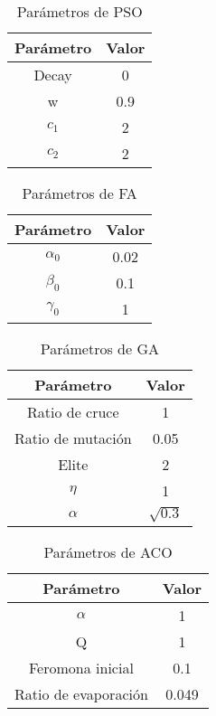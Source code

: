 \begin{table}[H]
    \centering
    \begin{tabular}{ c c }
        \hline
        \textbf{Parámetro} & \textbf{Valor} \\
        \hline
        Decay              & 0              \\
        w                  & 0.9            \\
        $c_1$              & 2              \\
        $c_2$              & 2              \\
        \hline
    \end{tabular}
    \caption{Parámetros de PSO}
\end{table}

\begin{table}[H]
    \centering
    \begin{tabular}{ c c }
        \hline
        \textbf{Parámetro} & \textbf{Valor} \\
        \hline
        $\alpha_0$         & 0.02           \\
        $\beta_0$          & 0.1            \\
        $\gamma_0$         & 1              \\
        \hline
    \end{tabular}
    \caption{Parámetros de FA}
\end{table}

\begin{table}[H]
    \centering
    \begin{tabular}{ c c }
        \hline
        \textbf{Parámetro} & \textbf{Valor} \\
        \hline
        Ratio de cruce     & 1              \\
        Ratio de mutación  & 0.05           \\
        Elite              & 2              \\
        $\eta$             & 1              \\
        $\alpha$           & $\sqrt{0.3}$   \\
        \hline
    \end{tabular}
    \caption{Parámetros de GA}
\end{table}

\begin{table}[H]
    \centering
    \begin{tabular}{ c c }
        \hline
        \textbf{Parámetro}   & \textbf{Valor} \\
        \hline
        $\alpha$             & 1              \\
        Q                    & 1              \\
        Feromona inicial     & 0.1            \\
        Ratio de evaporación & 0.049          \\
        \hline
    \end{tabular}
    \caption{Parámetros de ACO}
\end{table}

